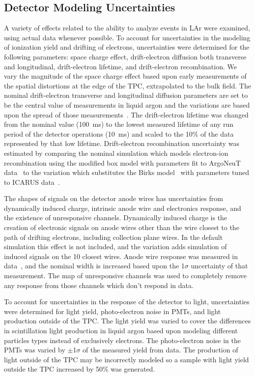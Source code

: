 \subsection{Detector Modeling Uncertainties}
\label{sect:syst_detector}
A variety of effects related to the ability to analyze events in LAr were examined, using actual data whenever possible.
To account for uncertainties in the modeling of ionization yield and drifting of electrons, uncertainties were determined for the following parameters: space charge effect, drift-electron diffusion both transverse and longitudinal, drift-electron lifetime, and drift-electron recombination. 
We vary the magnitude of the space charge effect based upon early measurements of the spatial distortions at the edge of the TPC, extrapolated to the bulk field.
The nominal drift-electron transverse and longitudinal diffusion parameters are set to be the central value of measurements in liquid argon and the variations are based upon the spread of those measurements~\cite{LI2016160}.
The drift-electron lifetime was changed from the nominal value (100~ms) to the lowest measured lifetime of any run period of the detector operations (10~ms) and scaled to the 10\% of the data represented by that low lifetime.  Drift-electron recombination uncertainty was estimated by comparing the nominal simulation which models electron-ion recombination using the modified box model with parameters fit to ArgoNeuT data~\cite{Acciarri_2013} to the variation which substitutes the Birks model~\cite{birks_model} with parameters tuned to ICARUS data~\cite{ICARUS_recomb}.

The shapes of signals on the detector anode wires has uncertainties from dynamically induced charge, intrinsic anode wire and electronics response, and the existence of unresponsive channels. Dynamically induced charge is the creation of electronic signals on anode wires other than the wire closest to the path of drifting electrons, including collection plane wires. In the default simulation this effect is not included, and the variation adds simulation of induced signals on the 10 closest wires. Anode wire response was measured in data~\cite{Adams:2018gbiPROCESS}, and the nominal width is increased based upon the 1$\sigma$ uncertainty of that measurement.  The map of unresponsive channels was used to completely remove any response from those channels which don't respond in data. 
  
To account for uncertainties in the response of the detector to light, uncertainties were determined for light yield, photo-electron noise in PMTs, and light production outside of the TPC. The light yield was varied to cover the differences in scintillation light production in liquid argon based upon modeling different particles types instead of exclusively electrons. The photo-electron noise in the PMTs was varied by $\pm$1$\sigma$ of the measured yield from data. The production of light outside of the TPC may be incorrectly modeled so a sample with light yield outside the TPC increased by 50\% was generated.

